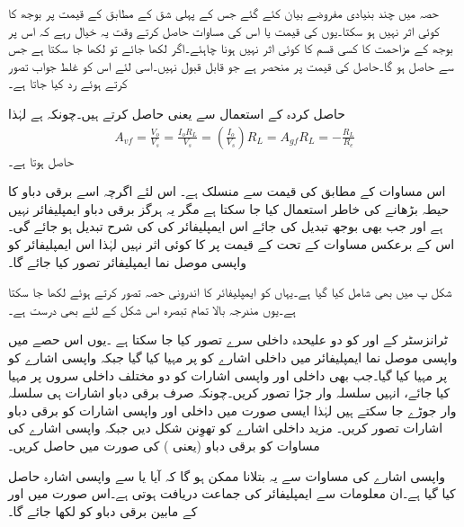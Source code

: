 حصہ  میں چند بنیادی مفروضے بیان کئے گئے جس کے پہلی شق کے مطابق  کے قیمت پر بوجھ  کا کوئی اثر نہیں ہو سکتا۔یوں  کی قیمت یا اس کی مساوات حاصل کرتے وقت یہ خیال رہے کہ اس پر بوجھ کے مزاحمت  کا کسی قسم کا کوئی اثر نہیں ہونا چاہئے۔اگر  لکھا جائے تو  لکھا جا سکتا ہے جس سے  حاصل ہو گا۔حاصل  کی قیمت  پر منحصر ہے جو قابل قبول نہیں۔اسی لئے اس کو غلط جواب تصور کرتے ہوئے رد کیا جاتا ہے۔

حاصل کردہ  کے استعمال سے  یعنی  حاصل کرتے ہیں۔چونکہ  ہے لہٰذا
\begin{align}
A_{vf}=\frac{V_o}{V_s}=\frac{I_o R_L}{V_s}=\left(\frac{I_o}{V_s} \right ) R_L=A_{gf} R_L=-\frac{R_L}{R_e}
\end{align}
حاصل ہوتا ہے۔

اس مساوات کے مطابق  کی قیمت  سے منسلک ہے۔ اس لئے اگرچہ اسے برقی دباو کا حیطہ بڑھانے کی خاطر استعمال کیا جا سکتا ہے مگر یہ ہرگز برقی دباو ایمپلیفائر نہیں ہے اور جب بھی بوجھ  تبدیل کی جائے اس ایمپلیفائر کی  کی شرح تبدیل ہو جائے گی۔اس کے برعکس مساوات  کے تحت  کے قیمت پر  کا کوئی اثر نہیں لہٰذا اس ایمپلیفائر کو واپسی موصل نما ایمپلیفائر تصور کیا جائے گا۔

شکل  پ میں  بھی شامل کیا گیا ہے۔یہاں  کو ایمپلیفائر کا اندرونی حصہ تصور کرتے ہوئے  لکھا جا سکتا ہے۔یوں مندرجہ بالا تمام تبصرہ اس شکل کے لئے بھی درست ہے۔

ٹرانزسٹر کے  اور  کو دو علیحدہ داخلی سرے تصور کیا جا سکتا ہے ۔یوں اس حصے میں واپسی موصل نما ایمپلیفائر میں داخلی اشارے  کو  پر مہیا کیا گیا جبکہ واپسی اشارے کو  پر مہیا کیا گیا۔جب بھی داخلی اور واپسی اشارات کو دو مختلف داخلی سروں پر مہیا کیا جائے، انہیں سلسلہ وار جڑا تصور کریں۔چونکہ صرف برقی دباو اشارات ہی سلسلہ وار جوڑے جا سکتے ہیں لہٰذا ایسی صورت میں داخلی اور واپسی اشارات کو برقی دباو  اشارات تصور کریں۔ مزید داخلی اشارے کو تھوِنن  شکل دیں جبکہ واپسی اشارے کی مساوات کو برقی دباو (یعنی ) کی صورت میں حاصل کریں۔

واپسی اشارے کی مساوات سے یہ بتلانا ممکن ہو گا کہ آیا  یا  سے واپسی اشارہ حاصل کیا گیا ہے۔ان معلومات سے ایمپلیفائر کی جماعت دریافت ہوتی ہے۔اس صورت میں  اور  کے مابین برقی دباو کو  لکھا جائے گا۔



